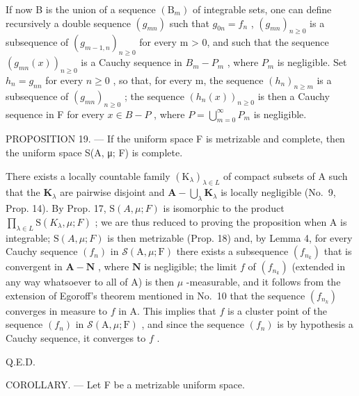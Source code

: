 If now B is the union of a sequence \((\mathrm{B}_{m})\) of integrable sets, one can define recursively a double sequence \((g_{mn})\) such that \(g_{0n} = f_{n}\) , \((g_{mn})_{n \geqslant 0}\) is a subsequence of \((g_{m-1,n})_{n \geqslant 0}\) for every m \textgreater{} 0, and such that the sequence \((g_{mn}(x))_{n \geqslant 0}\) is a Cauchy sequence in \(B_{m} - P_{m}\) , where \(P_{m}\) is negligible. Set \(h_{n} = g_{nn}\) for every \(n \geqslant 0\) , so that, for every m, the sequence \((h_{n})_{n \geqslant m}\) is a subsequence of \((g_{mn})_{n \geqslant 0}\) ; the sequence \((h_{n}(x))_{n \geqslant 0}\) is then a Cauchy sequence in F for every \(x \in B - P\) , where \(P = \bigcup_{m=0}^{\infty} P_{m}\) is negligible.

PROPOSITION 19. --- If the uniform space F is metrizable and complete, then the uniform space S(A, μ; F) is complete.

There exists a locally countable family \((\mathrm{K}_{\lambda})_{\lambda \in L}\) of compact subsets of A such that the \(\mathbf{K}_{\lambda}\) are pairwise disjoint and \(\mathbf{A} - \bigcup_{\lambda}\mathbf{K}_{\lambda}\) is locally negligible (No.~9, Prop. 14). By Prop. 17, \(\mathrm{S}(A,\mu;F)\) is isomorphic to the product \(\prod_{\lambda \in L}\mathrm{S}(K_{\lambda},\mu;F)\) ; we are thus reduced to proving the proposition when A is integrable; \(\mathrm{S}(A,\mu;F)\) is then metrizable (Prop. 18) and, by Lemma 4, for every Cauchy sequence \((f_n)\) in \(\mathcal{S}(\mathrm{A},\mu;\mathrm{F})\) there exists a subsequence \((f_{n_k})\) that is convergent in \(\mathbf{A} - \mathbf{N}\) , where \(\mathbf{N}\) is negligible; the limit \(f\) of \((f_{n_k})\) (extended in any way whatsoever to all of A) is then \(\mu\) -measurable, and it follows from the extension of Egoroff's theorem mentioned in No.~10 that the sequence \((f_{n_k})\) converges in measure to \(f\) in A. This implies that \(f\) is a cluster point of the sequence \((f_n)\) in \(\mathcal{S}(\mathrm{A},\mu;\mathrm{F})\) , and since the sequence \((f_n)\) is by hypothesis a Cauchy sequence, it converges to \(f\) .

Q.E.D.

COROLLARY. --- Let F be a metrizable uniform space.


